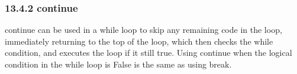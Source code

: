 \subsubsection{13.4.2 continue}
continue can be used in a while loop to skip any remaining code in the loop, immediately returning to the
top of the loop, which then checks the while condition, and executes the loop if it still true. Using continue
when the logical condition in the while loop is False is the same as using break.



